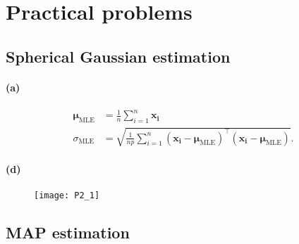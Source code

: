 \documentclass[a4paper,11pt]{article}
\begin{document}
\section{Practical problems}
\subsection{Spherical Gaussian estimation}
\paragraph{(a)}
\begin{align*}
\boldsymbol\mu_\mathrm{\scriptscriptstyle{MLE}}&=\frac{1}{n}\sum_{i=1}^n\mathbf{x_i}\\
\sigma_\mathrm{\scriptscriptstyle{MLE}}&=\sqrt{\frac{1}{np}\sum_{i=1}^n(\mathbf{x_i}-\boldsymbol\mu_\mathrm{\scriptscriptstyle{MLE}})^\top(\mathbf{x_i}-\boldsymbol\mu_\mathrm{\scriptscriptstyle{MLE}})}.
\end{align*}
\paragraph{(d)}
\begin{figure}[h!]
  \begin{center}
    \texttt{[image: P2\_1]}
  \end{center}
\end{figure}
\subsection{MAP estimation}
\end{document}
